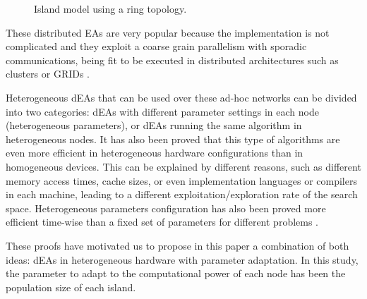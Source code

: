 \begin{figure}
\centering
{}
\caption{Island model using a ring topology.}
\label{fig:islands}
\end{figure}


These distributed EAs are very popular because the implementation is
not complicated  %
 and they exploit a coarse grain parallelism with sporadic %
 communications, being fit to be executed in distributed architectures
 such as clusters or GRIDs \cite{PLATO}. %

Heterogeneous dEAs that can be used over these ad-hoc networks can
be divided into two categories: dEAs with different parameter settings
in each node 
(heterogeneous parameters), or dEAs running the same algorithm in heterogeneous nodes. It  has also been
proved \cite{HETEROGENEOUSHARD} that this type of algorithms are even
more efficient in heterogeneous hardware configurations than in
homogeneous devices. This can be explained by different reasons, such
as different memory access times, cache sizes, %
or even implementation
languages or compilers in each machine, leading to a different
exploitation/exploration rate of the search space. %
Heterogeneous parameters
configuration  has also been proved more  efficient time-wise than a fixed
set %
of parameters for different problems
\cite{HETEROGENEOUSPARAMETERS}.   %

These proofs have motivated us to propose in this paper a combination of both ideas: dEAs in heterogeneous hardware with parameter adaptation. In this study, the parameter to adapt to the computational power of each node has been the population size of each island.

